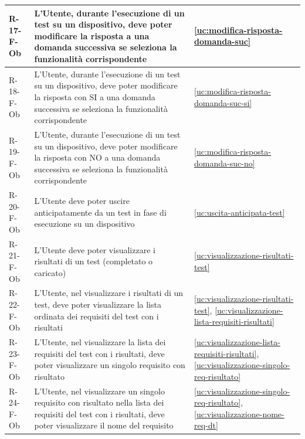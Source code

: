 ﻿\documentclass[a4paper,12pt]{article}
\begin{document}
{{\begin{longtable}{|l|p{}|p{}|}
            R-17-F-Ob       & L'Utente, durante l'esecuzione di un test su un dispositivo, deve poter modificare la risposta a una domanda successiva se seleziona la funzionalità corrispondente                         & \ref{uc:modifica-risposta-domanda-suc}                                                 \\ \hline
            R-18-F-Ob       & L'Utente, durante l'esecuzione di un test su un dispositivo, deve poter modificare la risposta con SI a una domanda successiva se seleziona la funzionalità corrispondente                         & \ref{uc:modifica-risposta-domanda-suc-si}                                                 \\ \hline
            R-19-F-Ob       & L'Utente, durante l'esecuzione di un test su un dispositivo, deve poter modificare la risposta con NO a una domanda successiva se seleziona la funzionalità corrispondente                         & \ref{uc:modifica-risposta-domanda-suc-no}                                                 \\ \hline
            R-20-F-Ob       & L'Utente deve poter uscire anticipatamente da un test in fase di esecuzione su un dispositivo                                                                                               & \ref{uc:uscita-anticipata-test}                                                 \\ \hline
            R-21-F-Ob       & L'Utente deve poter visualizzare i risultati di un test (completato o caricato)                                                                                                             & \ref{uc:visualizzazione-risultati-test}                                               \\ \hline
            R-22-F-Ob       & L'Utente, nel visualizzare i risultati di un test, deve poter visualizzare la lista ordinata dei requisiti del test con i risultati                                                         & \ref{uc:visualizzazione-risultati-test}, \ref{uc:visualizzazione-lista-requisiti-risultati}                 \\ \hline
            R-23-F-Ob       & L'Utente, nel visualizzare la lista dei requisiti del test con i risultati, deve poter visualizzare un singolo requisito con risultato                                                      & \ref{uc:visualizzazione-lista-requisiti-risultati}, \ref{uc:visualizzazione-singolo-req-risultato}         \\ \hline
            R-24-F-Ob       & L'Utente, nel visualizzare un singolo requisito con risultato nella lista dei requisiti del test con i risultati, deve poter visualizzare il nome del requisito                             & \ref{uc:visualizzazione-singolo-req-risultato}, \ref{uc:visualizzazione-nome-req-dt}         \\ \hline

\end{longtable}}}
\end{document}
